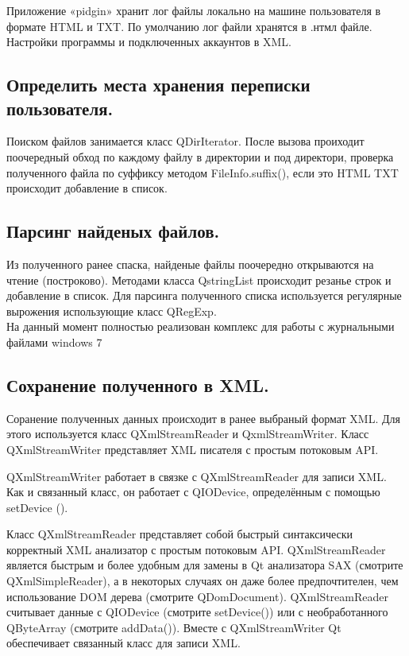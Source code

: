 Приложение «pidgin» хранит лог файлы локально на машине пользователя в формате HTML и TXT. По умолчанию лог файли хранятся в .нтмл файле. Настройки программы и подключенных аккаунтов в XML. \\

\subsection{Определить места хранения переписки пользователя.}

Поиском файлов занимается класс QDirIterator. После вызова проиходит поочередный обход по каждому файлу в директории и под директори, проверка полученного файла по суффиксу методом FileInfo.suffix(), если это HTML TXT происходит добавление в список.
\\

\subsection{Парсинг найденых файлов.}

Из полученного ранее спаска, найденые файлы поочередно открываются на чтение (построково). Методами класса QstringList происходит резанье строк и добавление в список. Для парсинга полученного списка используется регулярные вырожения использующие класс QRegExp.\\ 


На данный момент полностью реализован комплекс для работы с журнальными файлами windows 7\\

\subsection{Сохранение полученного в XML.}

Соранение полученных данных происходит в ранее выбраный формат XML. Для этого используется класс QXmlStreamReader и QxmlStreamWriter.
Класс QXmlStreamWriter представляет XML писателя с простым потоковым API.

QXmlStreamWriter работает в связке с QXmlStreamReader для записи XML. Как и связанный класс, он работает с QIODevice, определённым с помощью setDevice ().


Класс QXmlStreamReader представляет собой быстрый синтаксически корректный XML анализатор с простым потоковым API.
QXmlStreamReader является быстрым и более удобным для замены в Qt анализатора SAX (смотрите QXmlSimpleReader), а в некоторых случаях он даже более предпочтителен, чем использование DOM дерева (смотрите QDomDocument). QXmlStreamReader считывает данные с QIODevice (смотрите setDevice()) или с необработанного QByteArray (смотрите addData()). Вместе с QXmlStreamWriter Qt обеспечивает связанный класс для записи XML.\\

